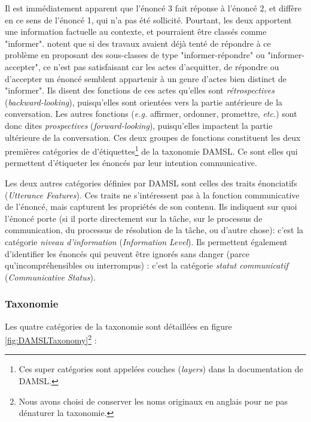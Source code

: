 \documentclass[10pt,a4paper,twoside]{article}
\begin{document}
Il est immédiatement apparent que l'énoncé 3 fait réponse à l'énoncé 2, et diffère en ce sens de l'énoncé 1, qui n'a pas été sollicité. Pourtant, les deux apportent une information factuelle au contexte, et pourraient être classés comme "informer". \citeauthor{core1997coding} notent que si des travaux avaient déjà tenté de répondre à ce problème en proposant des sous-classes de type "informer-répondre" ou "informer-accepter", ce n'est pas satisfaisant car les actes d'acquitter, de répondre ou d'accepter un énoncé semblent appartenir à un genre d'actes bien distinct de "informer". Ils disent des fonctions de ces actes qu'elles sont \textit{rétrospectives} (\textit{backward-looking}), puisqu'elles sont orientées vers la partie antérieure de la conversation. Les autres fonctions (\textit{e.g.} affirmer, ordonner, promettre, \textit{etc.}) sont donc dites \textit{prospectives} (\textit{forward-looking}), puisqu'elles impactent la partie ultérieure de la conversation. Ces deux groupes de fonctions constituent les deux premières catégories de d'étiquettes\footnote{Ces super catégories sont appelées \og couches \fg{} (\textit{layers}) dans la documentation de DAMSL.} de la taxonomie DAMSL. Ce sont elles qui permettent d'étiqueter les énoncés par leur intention communicative.

Les deux autres catégories définies par DAMSL sont celles des traits énonciatifs (\textit{Utterance Features}). Ces traits ne s'intéressent pas à la fonction communicative de l'énoncé, mais capturent les propriétés de son contenu. Ils indiquent sur quoi l'énoncé porte (si il porte directement sur la tâche, sur le processus de communication, du processus de résolution de la tâche, ou d'autre chose): c'est la catégorie \textit{niveau d'information} (\textit{Information Level}). Ils permettent également d'identifier les énoncés qui peuvent être ignorés sans danger (parce qu'incompréhensibles ou interrompus) : c'est la catégorie \textit{statut communicatif} (\textit{Communicative Status}).

\subsubsection{Taxonomie}

Les quatre catégories de la taxonomie sont détaillées en figure \ref{fig:DAMSLTaxonomy}\footnote{Nous avons choisi de conserver les noms originaux en anglais pour ne pas dénaturer la taxonomie.} :
\end{document}
